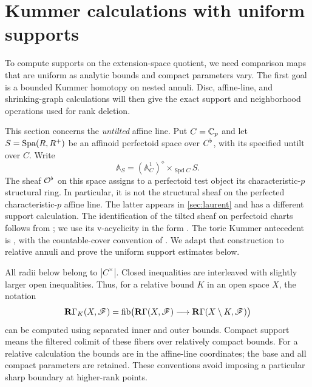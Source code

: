 \section{Kummer calculations with uniform supports}\label{sec:kummer}

To compute supports on the extension-space quotient, we need comparison
maps that are uniform as analytic bounds and compact parameters vary.
The first goal is a bounded Kummer homotopy on nested annuli. Disc,
affine-line, and shrinking-graph calculations will then give the exact
support and neighborhood operations used for rank deletion.

This section concerns the \emph{untilted} affine line.  Put
$C=\mathbb C_p$ and let $S=\operatorname{Spa}(R,R^+)$ be an affinoid perfectoid space over
$C^\flat$, with its specified untilt over $C$.  Write
\[
 \mathbb A_S=(\mathbb A^1_C)^\diamond\times_{\operatorname{Spd}C}S.
\]
The sheaf $\mathcal O^\flat$ on this space assigns to a perfectoid test object
its characteristic-$p$ structural ring.  In particular, it is not the
structural sheaf on the perfected characteristic-$p$ affine line.
The latter appears in \cref{sec:laurent} and has a different support
calculation.  The identification of the tilted sheaf on perfectoid
charts follows from \cite[Definition~5.10 and Lemma~5.11]{scholzeHodge2013};
we use its v-acyclicity in the form
\cite[Proposition~8.8]{scholzeDiamonds2017}.
The toric Kummer antecedent is
\cite[Example~4.4, Lemma~4.5(i), and the proof of Lemma~5.6]{scholzeHodge2013},
with the countable-cover convention of
\cite[item~(1)]{scholzeHodgeCorrigendum2016}.  We adapt that construction
to relative annuli and prove the uniform support estimates below.

All radii below belong to $|C^\times|$.  Closed inequalities are
interleaved with slightly larger open inequalities.  Thus, for a
relative bound $K$ in an open space $X$, the notation
\begin{equation}\label{eq:kum-support-fiber}
 \mathbf R\Gamma_K(X,\mathscr F)
 =\operatorname{fib}\bigl(\mathbf R\Gamma(X,\mathscr F)
           \longrightarrow\mathbf R\Gamma(X\setminus K,\mathscr F)\bigr)
\end{equation}
can be computed using separated inner and outer bounds.  Compact
support means the filtered colimit of these fibers over relatively
compact bounds.  For a relative calculation the bounds are in the
affine-line coordinates; the base and all compact parameters are
retained.  These conventions avoid imposing a particular sharp
boundary at higher-rank points.

